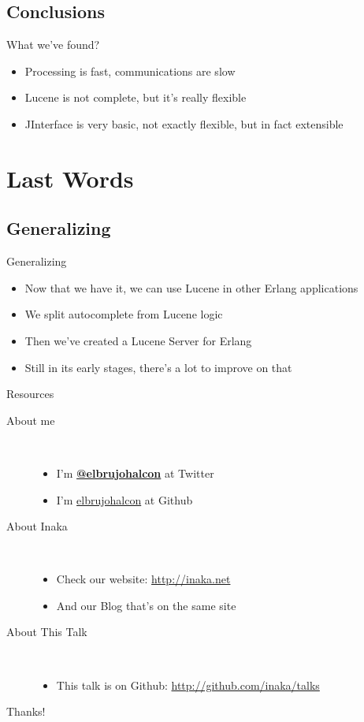 \documentclass[utf8,hyperref={colorlinks=true}]{beamer}
\begin{document}
\subsection{Conclusions}
\begin{frame}{What we've found?}
	\begin{itemize}
		\item<+->Processing is fast, communications are slow
		\item<+->Lucene is not complete, but it's really flexible
		\item<+->JInterface is very basic, not exactly flexible, but in fact extensible
	\end{itemize}
\end{frame}

\section{Last Words}
\subsection{Generalizing}
\begin{frame}{Generalizing}
	\begin{itemize}
		\item<+->Now that we have it, we can use Lucene in other Erlang applications
		\item<+->We split autocomplete from Lucene logic
		\item<+->Then we've created a Lucene Server for Erlang
		\item<+->Still in its early stages, there's a lot to improve on that
	\end{itemize}
\end{frame}

\begin{frame}{Resources}
	\begin{description}
		\item[About me]~\\
			\begin{itemize}
				\item I'm \textbf{\href{http://twitter.com/elbrujohalcon}{@elbrujohalcon}} at Twitter
				\item I'm \href{http://github.com/elbrujohalcon}{elbrujohalcon} at Github
			\end{itemize}
		\item[About Inaka]~\\
			\begin{itemize}
				\item Check our website: \href{http://inakanetworks.com}{http://inaka.net}
				\item And our Blog that's on the same site
			\end{itemize}
		\item[About This Talk]~\\
			\begin{itemize}
				\item This talk is on Github: \href{http://github.com/inaka/talks/pdfs/lucene\_server.pdf}{http://github.com/inaka/talks}
			\end{itemize}
	\end{description}
\end{frame}

\appendix

\begin{frame}
	\begin{center}
		{\Huge Thanks!}
	\end{center}
\end{frame}
\end{document}

